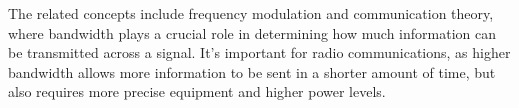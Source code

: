 The related concepts include frequency modulation and communication theory, where bandwidth plays a crucial role in determining how much information can be transmitted across a signal. It’s important for radio communications, as higher bandwidth allows more information to be sent in a shorter amount of time, but also requires more precise equipment and higher power levels.

